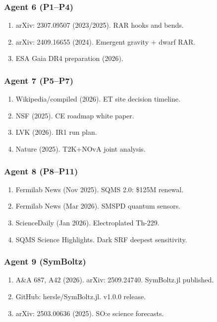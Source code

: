 \documentclass[11pt,a4paper]{article}
\begin{document}
\subsubsection{Agent 6 (P1--P4)}
\begin{enumerate}
\item arXiv: 2307.09507 (2023/2025). RAR hooks and bends.
\item arXiv: 2409.16655 (2024). Emergent gravity + dwarf RAR.
\item ESA Gaia DR4 preparation (2026).
\end{enumerate}

\subsubsection{Agent 7 (P5--P7)}
\begin{enumerate}
\item Wikipedia/compiled (2026). ET site decision timeline.
\item NSF (2025). CE roadmap white paper.
\item LVK (2026). IR1 run plan.
\item Nature (2025). T2K+NOvA joint analysis.
\end{enumerate}

\subsubsection{Agent 8 (P8--P11)}
\begin{enumerate}
\item Fermilab News (Nov 2025). SQMS 2.0: \$125M renewal.
\item Fermilab News (Mar 2026). SMSPD quantum sensors.
\item ScienceDaily (Jan 2026). Electroplated Th-229.
\item SQMS Science Highlights. Dark SRF deepest sensitivity.
\end{enumerate}

\subsubsection{Agent 9 (SymBoltz)}
\begin{enumerate}
\item A\&A 687, A42 (2026). arXiv: 2509.24740. SymBoltz.jl published.
\item GitHub: hersle/SymBoltz.jl. v1.0.0 release.
\item arXiv: 2503.00636 (2025). SO:e science forecasts.
\end{enumerate}
\end{document}
